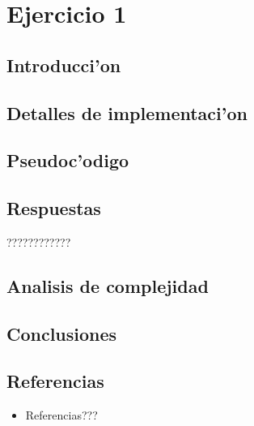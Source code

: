 \newpage
\section{Ejercicio 1}

\subsection{Introducci'on}


\subsection{Detalles de implementaci'on}


\subsection{Pseudoc'odigo}


\subsection{Respuestas}
????????????

\subsection{Analisis de complejidad}


\subsection{Conclusiones}


\subsection{Referencias}
\begin{itemize}
    \item Referencias???
\end{itemize}

